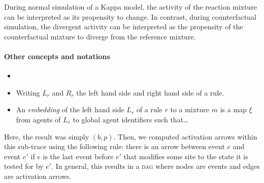 During normal simulation of a Kappa model, the activity of the
reaction mixture can be interpreted as its propensity to change. In
contrast, during counterfactual simulation, the divergent activity can
be interpreted as the propensity of the counterfactual mixture to
diverge from the reference mixture.

\paragraph{Other concepts and notations}



\begin{itemize}
\item 

\item Writing $L_r$ and $R_r$ the left hand side and right hand side of a rule.

\item An \emph{embedding} of the left hand side $L_r$ of a rule $r$ to
  a mixture $m$ is a map $\xi$ from agents of $L_r$ to global agent
  identifiers such that\dots
\end{itemize}

Here, the result was simply $(b, p)$. Then, we computed activation
arrows within this sub-trace using the following rule: there is an
arrow between event $e$ and event $e'$ if
$e$ is the last event before $e'$ that modifies some site to the state
it is tested for by $e'$. In general, this results in a \textsc{dag}
where nodes are events and edges are activation arrows.